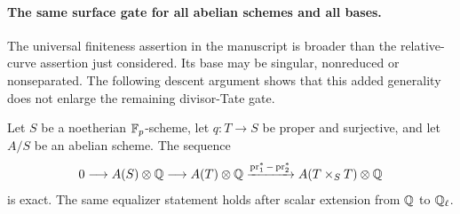 \paragraph{The same surface gate for all abelian schemes and all bases.}
The universal finiteness assertion in the manuscript is broader
than the relative-curve assertion just considered.  Its base may
be singular, nonreduced or nonseparated.  The following descent
argument shows that this added generality does not enlarge the
remaining divisor-Tate gate.

\begin{lemma}
\label{lem:B-proper-section-descent}
Let \(S\) be a noetherian \(\mathbb F_p\)-scheme, let
\(q:T\to S\) be proper and surjective, and let \(A/S\)
be an abelian scheme.  The sequence
\[
0\longrightarrow A(S)\otimes\mathbb Q
\longrightarrow A(T)\otimes\mathbb Q
\xrightarrow{\operatorname{pr}_1^*-\operatorname{pr}_2^*}
A(T\times_S T)\otimes\mathbb Q
\]
is exact.  The same equalizer statement holds after scalar
extension from \(\mathbb Q\) to \(\mathbb Q_\ell\).
\end{lemma}
